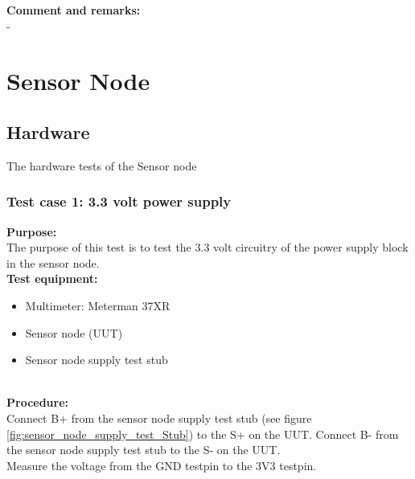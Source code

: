 \textbf{Comment and remarks:}\\
-\\

\section{Sensor Node}
\subsection{Hardware}
The hardware tests of the Sensor node
\subsubsection{Test case 1: 3.3 volt power supply}
\textbf{Purpose:}\\
The purpose of this test is to test the 3.3 volt circuitry of the power supply block in the sensor node.\\

\textbf{Test equipment:}
\begin{itemize}
	\item Multimeter: Meterman 37XR
	\item Sensor node (UUT)
	\item Sensor node supply test stub
\end{itemize}
\ \\
\textbf{Procedure:}\\
Connect B+ from the sensor node supply test stub (see figure \ref{fig:sensor_node_supply_test_Stub}) to the S+ on the UUT. Connect B- from the sensor node supply test stub to the S- on the UUT.\\
Measure the voltage from the GND testpin to the 3V3 testpin.

